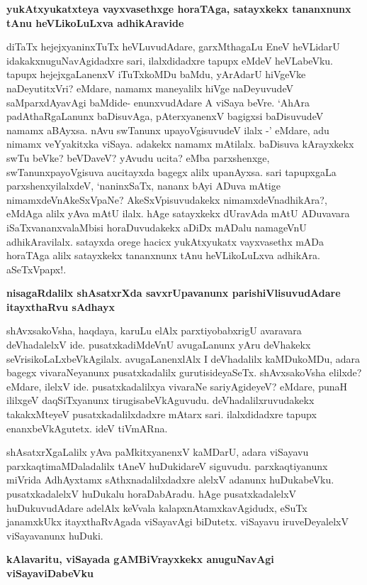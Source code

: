 {\bigskip
\noindent
{\large\bf yukAtxyukatxteya vayxvasethxge horaTAga, satayxkekx tananxnunx tAnu heVLikoLuLxva adhikAravide}}\label{249}
\medskip

\noindent
diTaTx hejejxyaninxTuTx heVLuvudAdare, garxMthagaLu EneV heVLidarU idakakxnuguNavAgidadxre sari, ilalxdidadxre tapupx eMdeV heVLabeVku. tapupx hejejxgaLanenxV iTuTxkoMDu baMdu, yArAdarU hiVgeVke naDeyutitxVri? eMdare, namamx maneyalilx hiVge naDeyuvudeV saMparxdAyavAgi baMdide- enunxvudAdare A viSaya beVre. `AhAra padAthaRgaLanunx baDisuvAga, pAterxyanenxV bagigxsi baDisuvudeV namamx aBAyxsa. nAvu swTanunx upayoVgisuvudeV ilalx -' eMdare, adu nimamx veYyakitxka viSaya. adakekx namamx mAtilalx. baDisuva kArayxkekx swTu beVke? beVDaveV? yAvudu ucita? eMba parxshenxge, swTanunxpayoVgisuva aucitayxda bagegx alilx upanAyxsa. sari tapupxgaLa parxshenxyilalxdeV, `naninxSaTx, nananx bAyi ADuva mAtige nimamxdeVnAkeSxVpaNe? AkeSxVpisuvudakekx nimamxdeVnadhikAra?, eMdAga alilx yAva mAtU ilalx. hAge satayxkekx dUravAda mAtU ADuvavara iSaTxvananxvalaMbisi horaDuvudakekx aDiDx mADalu namageVnU adhikAravilalx. satayxda orege hacicx yukAtxyukatx vayxvasethx mADa horaTAga alilx satayxkekx tananxnunx tAnu heVLikoLuLxva adhikAra. aSeTxVpapx!.

{\bigskip
\noindent
{\large\bf nisagaRdalilx shAsatxrXda savxrUpavanunx parishiVlisuvudAdare itayxthaRvu sAdhayx}}\label{page249}
\medskip

\noindent
shAvxsakoVsha, haqdaya, karuLu elAlx parxtiyobabxrigU avaravara deVhadalelxV ide. pusatxkadiMdeVnU avugaLanunx yAru deVhakekx seVrisikoLaLxbeVkAgilalx. avugaLanenxlAlx I deVhadalilx kaMDukoMDu, adara bagegx vivaraNeyanunx pusatxkadalilx gurutisideyaSeTx. shAvxsakoVsha elilxde? eMdare, ilelxV ide. pusatxkadalilxya vivaraNe sariyAgideyeV? eMdare, punaH ililxgeV daqSiTxyanunx tirugisabeVkAguvudu. deVhadalilxruvudakekx takakxMteyeV pusatxkadalilxdadxre mAtarx sari. ilalxdidadxre tapupx enanxbeVkAgutetx. ideV tiVmARna.

shAsatxrXgaLalilx yAva paMkitxyanenxV kaMDarU, adara viSayavu parxkaqtimaMDaladalilx tAneV huDukidareV siguvudu. parxkaqtiyanunx miVrida AdhAyxtamx sAthxnadalilxdadxre alelxV adanunx huDukabeVku. pusatxkadalelxV huDukalu horaDabAradu. hAge pusatxkadalelxV huDukuvudAdare adelAlx keVvala kalapxnAtamxkavAgidudx, eSuTx janamxkUkx itayxthaRvAgada viSayavAgi biDutetx. viSayavu iruveDeyalelxV viSayavanunx huDuki.

{\bigskip
\noindent
{\large\bf kAlavaritu, viSayada gAMBiVrayxkekx anuguNavAgi viSayaviDabeVku}}\label{page250a}
\medskip

